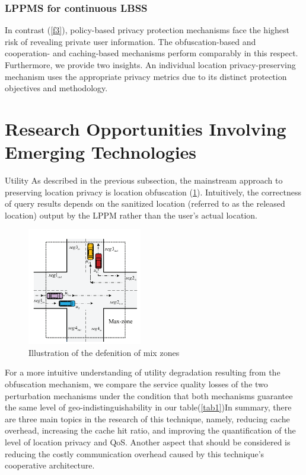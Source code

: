 \documentclass{acmart}
\begin{document}
\subsubsection{LPPMS for continuous LBSS}
In contrast (\ref{f3}), policy-based privacy protection mechanisms face the highest risk of revealing private user information. The obfuscation-based and cooperation- and caching-based mechanisms perform comparably in this respect. Furthermore, we provide two insights. An individual location privacy-preserving mechanism uses the appropriate privacy metrics due to its distinct protection objectives and methodology.
\section{Research Opportunities Involving Emerging Technologies}
Utility As described in the previous subsection, the mainstream approach to preserving location privacy is location obfuscation (\ref{2}). Intuitively, the correctness of query results depends on the sanitized location (referred to as the released location) output by the LPPM rather than the user’s actual location.
\begin{figure}[H]
    \centering
    \includegraphics[width=50mm]{il.png}
    \caption{Illustration of the defenition of mix zones}
    \label{2}
\end{figure}
For a more intuitive understanding of utility degradation resulting from the obfuscation mechanism, we compare the service quality losses of the two perturbation mechanisms under the condition that both mechanisms guarantee the same level of geo-indistinguishability in our table(\ref{tab1})In summary, there are three main topics in the research of this technique, namely, reducing cache overhead, increasing the cache hit ratio, and improving the quantification of the level of location privacy and QoS. Another aspect that should be considered is reducing the costly communication overhead caused by this technique’s cooperative architecture.
\end{document}
